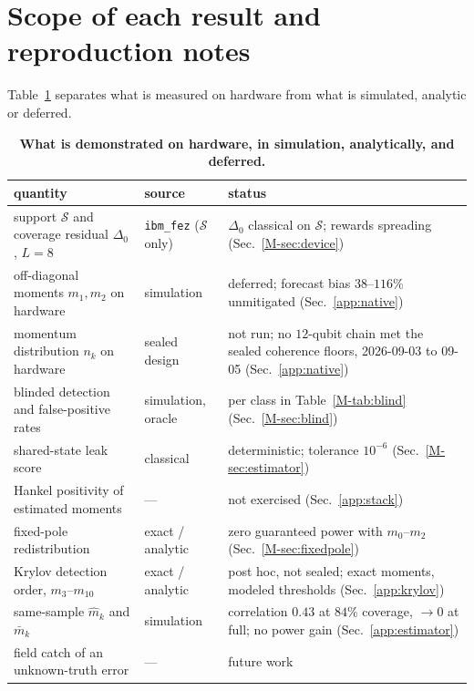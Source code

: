 \documentclass[aps,prb,onecolumn,superscriptaddress,longbibliography,floatfix]{revtex4-2}
\begin{document}
\section{Scope of each result and reproduction notes}
\label{app:scope}
Table~\ref{tab:scope} separates what is measured on hardware from what is simulated, analytic or deferred.

\begin{table}[htbp]
\caption{\textbf{What is demonstrated on hardware, in simulation, analytically, and deferred.}}
\label{tab:scope}
\small
\begin{tabular}{p{}p{}p{}}
\toprule
quantity & source & status \tabularnewline
\midrule
\raggedright support $\mathcal S$ and coverage residual $\Delta_0$, $L=8$ & \raggedright\texttt{ibm\_fez} ($\mathcal S$ only) & \raggedright $\Delta_0$ classical on $\mathcal S$; rewards spreading (Sec.~\ref{M-sec:device}) \tabularnewline\addlinespace[2pt]
\raggedright off-diagonal moments $m_1,m_2$ on hardware & \raggedright simulation & \raggedright deferred; forecast bias $38$--$116\%$ unmitigated (Sec.~\ref{app:native}) \tabularnewline\addlinespace[2pt]
\raggedright momentum distribution $n_k$ on hardware & \raggedright sealed design & \raggedright not run; no $12$-qubit chain met the sealed coherence floors, 2026-09-03 to 09-05 (Sec.~\ref{app:native}) \tabularnewline\addlinespace[2pt]
\raggedright blinded detection and false-positive rates & \raggedright simulation, oracle & \raggedright per class in Table~\ref{M-tab:blind} (Sec.~\ref{M-sec:blind}) \tabularnewline\addlinespace[2pt]
\raggedright shared-state leak score & \raggedright classical & \raggedright deterministic; tolerance $10^{-6}$ (Sec.~\ref{M-sec:estimator}) \tabularnewline\addlinespace[2pt]
\raggedright Hankel positivity of estimated moments & \raggedright --- & \raggedright not exercised (Sec.~\ref{app:stack}) \tabularnewline\addlinespace[2pt]
\raggedright fixed-pole redistribution & \raggedright exact / analytic & \raggedright zero guaranteed power with $m_0$--$m_2$ (Sec.~\ref{M-sec:fixedpole}) \tabularnewline\addlinespace[2pt]
\raggedright Krylov detection order, $m_3$--$m_{10}$ & \raggedright exact / analytic & \raggedright post hoc, not sealed; exact moments, modeled thresholds (Sec.~\ref{app:krylov}) \tabularnewline\addlinespace[2pt]
\raggedright same-sample $\widehat m_k$ and $\bar m_k$ & \raggedright simulation & \raggedright correlation $0.43$ at $84\%$ coverage, ${\to}0$ at full; no power gain (Sec.~\ref{app:estimator}) \tabularnewline\addlinespace[2pt]
\raggedright field catch of an unknown-truth error & \raggedright --- & \raggedright future work \tabularnewline
\bottomrule
\end{tabular}
\end{table}
\end{document}
